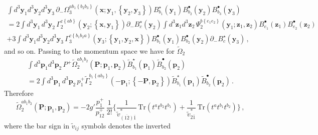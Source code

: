 \documentclass[english,american]{article}
\begin{document}
\begin{multline}
\int d^{3}\mathbf{y}_{1}d^{3}\mathbf{y}_{2}d^{3}\mathbf{y}_{3}\,\partial_{-}\Omega_{3}^{ab_{1}\left\{ b_{2}b_{3}\right\} }\left(\mathbf{x};\mathbf{y}_{1},\left\{ \mathbf{y}_{2},\mathbf{y}_{3}\right\} \right)B_{b_{1}}^{\star}\left(\mathbf{y}_{1}\right)B_{b_{2}}^{\bullet}\left(\mathbf{y}_{2}\right)B_{b_{3}}^{\bullet}\left(\mathbf{y}_{3}\right)\\
=2\int d^{3}\mathbf{y}_{1}\, d^{3}\mathbf{y}_{2}\,\Gamma_{2}^{c\left\{ ab\right\} }\left(\mathbf{y}_{2};\left\{ \mathbf{x},\mathbf{y}_{1}\right\} \right)\partial_{-}B_{c}^{\star}\left(\mathbf{y}_{2}\right)\int d^{3}\mathbf{z}_{1}d^{3}\mathbf{z}_{2}\,\Psi_{2}^{b\left\{ e_{1}e_{2}\right\} }\left(\mathbf{y}_{1};\mathbf{z}_{1},\mathbf{z}_{2}\right)B_{e_{1}}^{\bullet}\left(\mathbf{z}_{1}\right)B_{e_{2}}^{\bullet}\left(\mathbf{z}_{2}\right)\\
+3\int d^{3}\mathbf{y}_{1}d^{3}\mathbf{y}_{2}d^{3}\mathbf{y}_{3}\,\Gamma_{3}^{c\left\{ b_{1}b_{2}a\right\} }\left(\mathbf{y}_{3};\left\{ \mathbf{y}_{1},\mathbf{y}_{2},\mathbf{x}\right\} \right)B_{b_{1}}^{\bullet}\left(\mathbf{y}_{1}\right)B_{b_{2}}^{\bullet}\left(\mathbf{y}_{2}\right)\partial_{-}B_{c}^{\star}\left(\mathbf{y}_{3}\right)\,,
\end{multline}
and so on. Passing to the momentum space we have for $\tilde{\Omega}_{2}$
\begin{multline}
\int d^{3}\mathbf{p}_{1}d^{3}\mathbf{p}_{2}\, P^{+}\tilde{\Omega}_{2}^{ab_{1}b_{2}}\left(\mathbf{P};\mathbf{p}_{1},\mathbf{p}_{2}\right)\tilde{B}_{b_{1}}^{\star}\left(\mathbf{p}_{1}\right)\tilde{B}_{b_{2}}^{\bullet}\left(\mathbf{p}_{2}\right)\\
=2\int d^{3}\mathbf{p}_{1}\, d^{3}\mathbf{p}_{2}\, p_{1}^{+}\tilde{\Gamma}_{2}^{b_{1}\left\{ ab_{2}\right\} }\left(-\mathbf{p}_{1};\left\{ -\mathbf{P},\mathbf{p}_{2}\right\} \right)\tilde{B}_{b_{1}}^{\star}\left(\mathbf{p}_{1}\right)\tilde{B}_{b_{2}}^{\bullet}\left(\mathbf{p}_{2}\right)\,.
\end{multline}
Therefore
\begin{equation}
\tilde{\Omega}_{2}^{ab_{1}b_{2}}\left(\mathbf{P};\mathbf{p}_{1},\mathbf{p}_{2}\right)=-2g'\frac{p_{1}^{+}}{p_{12}^{+}}\,\frac{1}{2!}\Bigg\{\frac{1}{\tilde{v}_{\overline{\left(12\right)}\overline{1}}^{*}}\,\mathrm{Tr}\left(t^{a}t^{b_{2}}t^{b_{1}}\right)+\frac{1}{\tilde{v}_{2\overline{1}}^{*}}\,\mathrm{Tr}\left(t^{a}t^{b_{1}}t^{b_{2}}\right)\Bigg\}\,,
\end{equation}
where the bar sign in $\tilde{v}_{ij}$ symbols denotes the inverted
\end{document}
